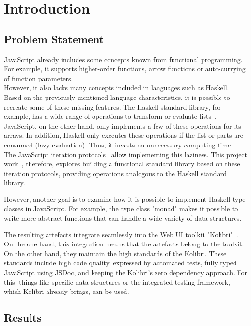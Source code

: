 \chapter{Introduction}
\label{chap:introduction}

\thispagestyle{empty}
\section*{Problem Statement} %
\label{sec:Problem Statement}
JavaScript already includes some concepts known from functional programming.
For example, it supports higher-order functions, arrow functions or
auto-currying of function parameters.\\
However, it also lacks many concepts included in languages such as Haskell. Based on
the previously mentioned language characteristics, it is possible to recreate some of
these missing features. The Haskell standard library, for example, has a wide range of
operations to transform or evaluate lists~\cite{haskell_list}. JavaScript, on the other hand, only
implements a few of these operations for its arrays. In addition, Haskell only
executes these operations if the list or parts are consumed (lazy evaluation).
Thus, it invests no unnecessary computing time.\\
The JavaScript iteration protocols~\cite{mdn_protocols} allow implementing this laziness. This
project work~\cite{wild_wyss_ip6_2023}, therefore, explores building a functional standard library based
on these iteration protocols, providing operations analogous to the Haskell
standard library.

However, another goal is to examine how it is possible to implement Haskell
type classes in JavaScript. 
For example, the type class "monad" makes it possible to write more abstract functions that can
handle a wide variety of data structures.

The resulting artefacts integrate seamlessly into the Web UI toolkit
"Kolibri"~\cite{kolibri}. On the one hand, this integration means that the
artefacts belong to the toolkit. On the other hand, they maintain the high
standards of the Kolibri. These standards include high code quality, expressed
by automated tests, fully typed JavaScript using JSDoc, and keeping the
Kolibri's zero dependency approach. For this, things like specific data
structures or the integrated testing framework, which Kolibri already
brings, can be used.

\section*{Results} %
\label{sec:Introduction_Results}

